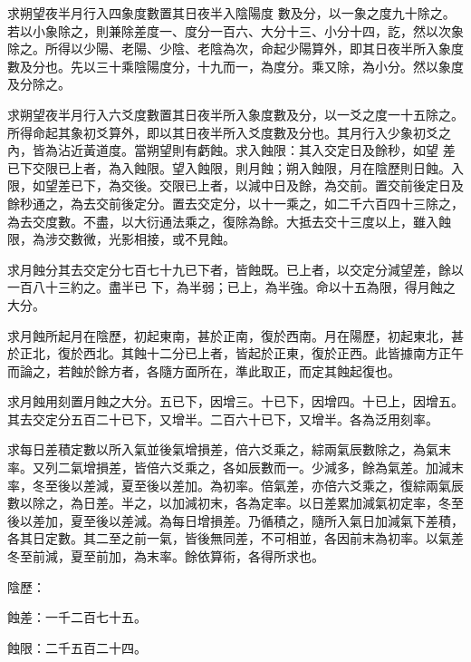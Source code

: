 \begin{pinyinscope}
 求朔望夜半月行入四象度數置其日夜半入陰陽度
 數及分，以一象之度九十除之。若以小象除之，則兼除差度一、度分一百六、大分十三、小分十四，訖，然以次象除之。所得以少陽、老陽、少陰、老陰為次，命起少陽算外，即其日夜半所入象度數及分也。先以三十乘陰陽度分，十九而一，為度分。乘又除，為小分。然以象度及分除之。



 求朔望夜半月行入六爻度數置其日夜半所入象度數及分，以一爻之度一十五除之。所得命起其象初爻算外，即以其日夜半所入爻度數及分也。其月行入少象初爻之內，皆為沾近黃道度。當朔望則有虧蝕。求入蝕限：其入交定日及餘秒，如望
 差已下交限已上者，為入蝕限。望入蝕限，則月蝕；朔入蝕限，月在陰歷則日蝕。入限，如望差已下，為交後。交限已上者，以減中日及餘，為交前。置交前後定日及餘秒通之，為去交前後定分。置去交定分，以十一乘之，如二千六百四十三除之，為去交度數。不盡，以大衍通法乘之，復除為餘。大抵去交十三度以上，雖入蝕限，為涉交數微，光影相接，或不見蝕。



 求月蝕分其去交定分七百七十九已下者，皆蝕既。已上者，以交定分減望差，餘以一百八十三約之。盡半已
 下，為半弱；已上，為半強。命以十五為限，得月蝕之大分。



 求月蝕所起月在陰歷，初起東南，甚於正南，復於西南。月在陽歷，初起東北，甚於正北，復於西北。其蝕十二分已上者，皆起於正東，復於正西。此皆據南方正午而論之，若蝕於餘方者，各隨方面所在，準此取正，而定其蝕起復也。



 求月蝕用刻置月蝕之大分。五已下，因增三。十已下，因增四。十已上，因增五。其去交定分五百二十已下，又增半。二百六十已下，又增半。各為泛用刻率。



 求每日差積定數以所入氣並後氣增損差，倍六爻乘之，綜兩氣辰數除之，為氣末率。又列二氣增損差，皆倍六爻乘之，各如辰數而一。少減多，餘為氣差。加減末
 率，冬至後以差減，夏至後以差加。為初率。倍氣差，亦倍六爻乘之，復綜兩氣辰數以除之，為日差。半之，以加減初末，各為定率。以日差累加減氣初定率，冬至後以差加，夏至後以差減。為每日增損差。乃循積之，隨所入氣日加減氣下差積，各其日定數。其二至之前一氣，皆後無同差，不可相並，各因前末為初率。以氣差冬至前減，夏至前加，為末率。餘依算術，各得所求也。



 陰歷：



 蝕差：一千二百七十五。



 蝕限：二千五百二十四。




\end{pinyinscope}
